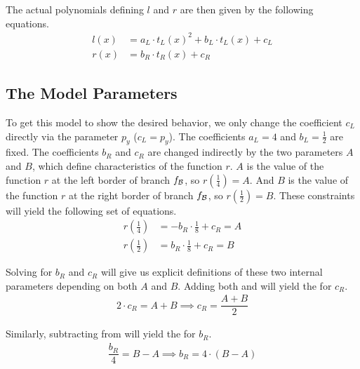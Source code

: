 The actual polynomials defining $l$ and $r$ are then given by the following equations.
\begin{align}
	l(x) & = a_L \cdot t_L(x)^2 + b_L \cdot t_L(x) + c_L \\
	r(x) & = b_R \cdot t_R(x) + c_R
	\label{equ:final.def.r}
\end{align}

\subsection{The Model Parameters}

To get this model to show the desired behavior, we only change the coefficient $c_L$ directly via the parameter $p_y$ ($c_L = p_y$).
The coefficients $a_L = 4$ and $b_L = \frac{1}{2}$ are fixed.
The coefficients $b_R$ and $c_R$ are changed indirectly by the two parameters $A$ and $B$, which define characteristics of the function $r$.
$A$ is the value of the function $r$ at the left border of branch $f_{\mathcal{B}}$, so $r(\frac{1}{4}) = A$.
And $B$ is the value of the function $r$ at the right border of branch $f_{\mathcal{B}}$, so $r(\frac{1}{2}) = B$.
These constraints will yield the following set of equations.
\begin{subequations}
	\begin{align}
		r\left(\frac{1}{4}\right) & = - b_R \cdot \frac{1}{8} + c_R = A
		\label{equ:final.def.param.constr.A}
		\\
		r\left(\frac{1}{2}\right) & = b_R \cdot \frac{1}{8} + c_R = B
		\label{equ:final.def.param.constr.B}
	\end{align}
\end{subequations}

Solving for $b_R$ and $c_R$ will give us explicit definitions of these two internal parameters depending on both $A$ and $B$.
Adding both  and  will yield the  for $c_R$.
\begin{align}
	2 \cdot c_R = A + B \implies c_R = \dfrac{A + B}{2}
	\label{equ:final.def.param.cR}
\end{align}

Similarly, subtracting  from  will yield the  for $b_R$.
\begin{align}
	\dfrac{b_R}{4} = B - A \implies b_R = 4 \cdot (B - A)
	\label{equ:final.def.param.bR}
\end{align}

